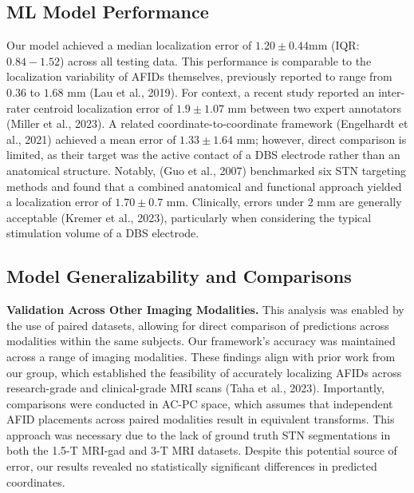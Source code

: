 \subsection{ML Model Performance}
Our model achieved a median localization error of \( 1.20 \pm 0.44\text{mm} \) (IQR: \( 0.84 - 1.52 \)) across all testing data. This performance is comparable to the localization variability of AFIDs themselves, previously reported to range from \( 0.36 \) to \( 1.68 \text{ mm} \) (Lau et al., 2019). For context, a recent study reported an inter-rater centroid localization error of \( 1.9 \pm 1.07 \text{ mm} \) between two expert annotators (Miller et al., 2023). A related coordinate-to-coordinate framework (Engelhardt et al., 2021) achieved a mean error of \( 1.33 \pm 1.64 \text{ mm} \); however, direct comparison is limited, as their target was the active contact of a DBS electrode rather than an anatomical structure. Notably, (Guo et al., 2007) benchmarked six STN targeting methods and found that a combined anatomical and functional approach yielded a localization error of \( 1.70 \pm 0.7 \text{ mm} \). Clinically, errors under \( 2 \text{ mm} \) are generally acceptable (Kremer et al., 2023), particularly when considering the typical stimulation volume of a DBS electrode.

\subsection{Model Generalizability and Comparisons}
\textbf{Validation Across Other Imaging Modalities.} This analysis was enabled by the use of paired datasets, allowing for direct comparison of predictions across modalities within the same subjects. Our framework’s accuracy was maintained across a range of imaging modalities. These findings align with prior work from our group, which established the feasibility of accurately localizing AFIDs across research-grade and clinical-grade MRI scans (Taha et al., 2023). Importantly, comparisons were conducted in AC-PC space, which assumes that independent AFID placements across paired modalities result in equivalent transforms. This approach was necessary due to the lack of ground truth STN segmentations in both the 1.5-T MRI-gad and 3-T MRI datasets. Despite this potential source of error, our results revealed no statistically significant differences in predicted coordinates.

